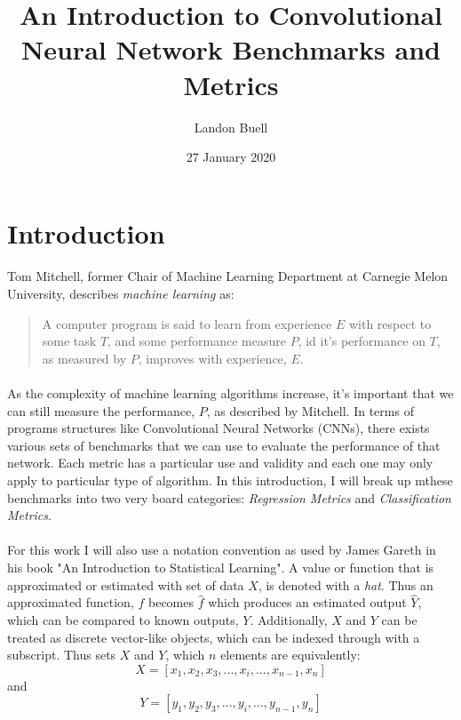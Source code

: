 \documentclass[12pt,letterpaper]{article}
\begin{document}

\title{An Introduction to Convolutional Neural Network Benchmarks and Metrics}
\author{Landon Buell}
\date{27 January 2020}
\maketitle


\section{Introduction}
\paragraph*{}Tom Mitchell, former Chair of Machine Learning Department at Carnegie Melon University, describes \textit{machine learning} as:
\begin{quote}
A computer program is said to learn from experience $E$ with respect to some task $T$, and some performance measure $P$, id it's performance on $T$, as measured by $P$, improves with experience, $E$. \cite{Geron}
\end{quote}
\paragraph*{}As the complexity of machine learning algorithms increase, it's important that we can still measure the performance, $P$, as described by Mitchell. In terms of programs structures like Convolutional Neural Networks (CNNs), there exists various sets of benchmarks that we can use to evaluate the performance of that network. Each metric has a particular use and validity and each one may only apply to particular type of algorithm. In this introduction, I will break up mthese benchmarks into two very board categories: \textit{Regression Metrics} and \textit{Classification Metrics}.
\paragraph*{}For this work I will also use a notation convention as used by James Gareth in his book "An Introduction to Statistical Learning". A value or function that is approximated or estimated with  set of data $X$, is denoted with a \textit{hat}. Thus an approximated function, $f$ becomes $\hat{f}$ which produces an estimated output $\hat{Y}$, which can be compared to known outputs, $Y$. Additionally, $X$ and $Y$ can be treated as discrete vector-like objects, which can be indexed through with a subscript. Thus sets $X$ and $Y$, which $n$ elements are equivalently:
\begin{equation}
X = [x_1, x_2 , x_3 , ... , x_i , ... , x_{n-1} , x_n]
\end{equation}
and
\begin{equation}
Y = [y_1, y_2 , y_3 , ... , y_i , ... , y_{n-1} , y_n]
\end{equation}
\end{document}
